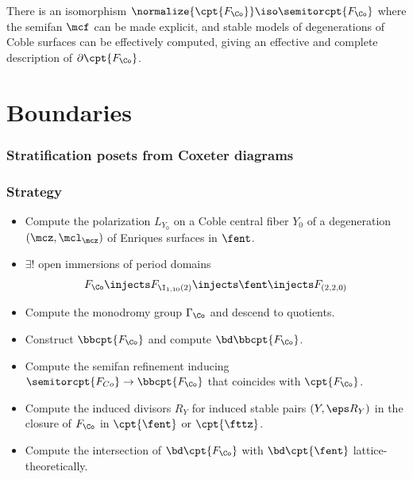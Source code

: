 \documentclass{beamer}
\begin{document}
{\begin{frame}
\begin{conjecture}
There is an isomorphism $\normalize{\cpt{F _{\Co}}} \iso \semitorcpt{F_{\Co}}$ where the semifan $\mcf$ can be made explicit, and stable models of degenerations of Coble surfaces can be effectively computed, giving an effective and complete description of $\partial \cpt{F_{\Co}}$.
\end{conjecture}

\end{frame}
\section{Boundaries}
\begin{frame}
\end{frame}
\begin{frame}\frametitle{Stratification posets from Coxeter diagrams}
\end{frame}

\begin{frame}\frametitle{Strategy}
{\small
\begin{itemize}
\item Compute the polarization $L_{Y_0}$ on a Coble central fiber $Y_0$ of a degeneration $(\mcz, \mcl_{\mcz} )$ of Enriques surfaces in $\fent$.
\item $\exists !$ open immersions of period domains
\[ F_{\Co} \injects F_{\I_{1, 10}(2)} \injects \fent \injects F_{(2,2,0)} \]
\item Compute the monodromy group $\Gamma_{\Co}$ and descend to quotients.
\item Construct $\bbcpt{F_{\Co}}$ and compute $\bd \bbcpt{F_{\Co}}$.
\item Compute the semifan refinement inducing $\semitorcpt{F_{Co}} \to \bbcpt{F_{\Co}}$ that coincides with $\cpt{F_{\Co}}$.
\item Compute the induced divisors $R_Y$ for induced stable pairs $(Y, \eps R_Y)$ in the closure of $F_{\Co}$ in $\cpt{\fent}$ or $\cpt{\fttz}$.
\item Compute the intersection of $\bd \cpt{F_{\Co}}$ with $\bd \cpt{\fent}$ lattice-theoretically.
\end{itemize}
}
\end{frame}

}
\end{document}
